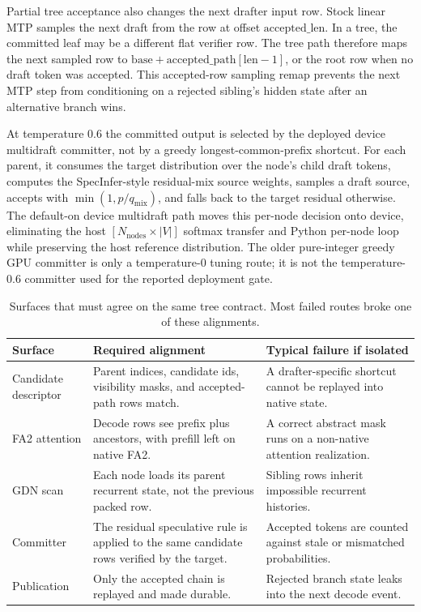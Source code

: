 \documentclass[conference]{IEEEtran}
\newcommand{\rowsep}{\specialrule{0.15pt}{1.2pt}{1.2pt}}
\begin{document}
Partial tree acceptance also changes the next drafter input row. Stock linear MTP samples the next draft from the row at offset \(\mathrm{accepted\_len}\). In a tree, the committed leaf may be a different flat verifier row. The tree path therefore maps the next sampled row to \(\mathrm{base}+\mathrm{accepted\_path}[\mathrm{len}-1]\), or the root row when no draft token was accepted. This accepted-row sampling remap prevents the next MTP step from conditioning on a rejected sibling's hidden state after an alternative branch wins.

At temperature 0.6 the committed output is selected by the deployed device multidraft committer, not by a greedy longest-common-prefix shortcut. For each parent, it consumes the target distribution over the node's child draft tokens, computes the SpecInfer-style residual-mix source weights, samples a draft source, accepts with \(\min(1,p/q_{\mathrm{mix}})\), and falls back to the target residual otherwise. The default-on device multidraft path moves this per-node decision onto device, eliminating the host \([N_{\mathrm{nodes}}\times |V|]\) softmax transfer and Python per-node loop while preserving the host reference distribution. The older pure-integer greedy GPU committer is only a temperature-0 tuning route; it is not the temperature-0.6 committer used for the reported deployment gate.

\begin{table}[t]
\caption{Surfaces that must agree on the same tree contract. Most failed routes broke one of these alignments.}
\label{tab:surfaces}
\centering
\scriptsize
\begin{adjustbox}{width=\columnwidth}
\begin{tabular}{L{0.30\columnwidth} L{0.31\columnwidth} L{0.29\columnwidth}}
\toprule
Surface & Required alignment & Typical failure if isolated \\
\midrule
Candidate descriptor & Parent indices, candidate ids, visibility masks, and accepted-path rows match. & A drafter-specific shortcut cannot be replayed into native state. \\
\rowsep
FA2 attention & Decode rows see prefix plus ancestors, with prefill left on native FA2. & A correct abstract mask runs on a non-native attention realization. \\
\rowsep
GDN scan & Each node loads its parent recurrent state, not the previous packed row. & Sibling rows inherit impossible recurrent histories. \\
\rowsep
Committer & The residual speculative rule is applied to the same candidate rows verified by the target. & Accepted tokens are counted against stale or mismatched probabilities. \\
\rowsep
Publication & Only the accepted chain is replayed and made durable. & Rejected branch state leaks into the next decode event. \\
\bottomrule
\end{tabular}
\end{adjustbox}
\end{table}
\end{document}
